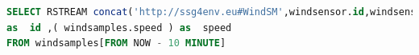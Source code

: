 \documentclass[runningheads,a4paper]{llncs}
\begin{document}
\begin{lstlisting}[style=HaskellSNEE,language=SQL,frame=none]
SELECT RSTREAM concat('http://ssg4env.eu#WindSM',windsensor.id,windsensor.ts )
as  id ,( windsamples.speed ) as  speed
FROM windsamples[FROM NOW - 10 MINUTE]
\end{lstlisting}
%

\vspace{-10pt}

%

%
%







\end{document}

